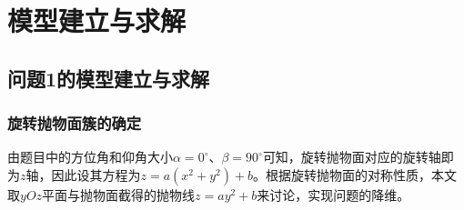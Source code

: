 \documentclass{myclass}
\begin{document}
\newpage
\section{模型建立与求解}
\subsection{问题1的模型建立与求解}
\subsubsection{旋转抛物面簇的确定}
由题目中的方位角和仰角大小$\alpha = 0^{\circ}$、$\beta = 90^{\circ}$可知，旋转抛物面对应的旋转轴即为$z$轴，因此设其方程为$z = a(x^2 + y^2)+b$。根据旋转抛物面的对称性质，本文取$yOz$平面与抛物面截得的抛物线$z = ay^2+b$来讨论，实现问题的降维。\par
\end{document}
